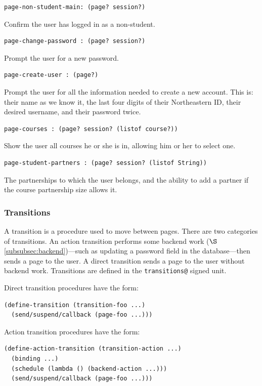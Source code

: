 \documentclass[a4paper]{article}
\begin{document}
\begin{verbatim}
page-non-student-main: (page? session?)
\end{verbatim}
Confirm the user has logged in as a non-student.

\begin{verbatim}
page-change-password : (page? session?)
\end{verbatim}
Prompt the user for a new password.

\begin{verbatim}
page-create-user : (page?)
\end{verbatim}
Prompt the user for all the information needed to create a
new account. This is: their name as we know it, the last
four digits of their Northeastern ID, their desired username,
and their password twice.

\begin{verbatim}
page-courses : (page? session? (listof course?))
\end{verbatim}
Show the user all courses he or she is in, allowing him or her to select one.

\begin{verbatim}
page-student-partners : (page? session? (listof String))
\end{verbatim}
The partnerships to which the user belongs, and the ability to add a partner if
the course partnership size allows it.

\subsubsection{Transitions}\label{subsubsec:transitions}

A transition is a procedure used to move between pages. There are two categories
of transitions. An action transition performs some backend work
($\S$\ref{subsubsec:backend})---such as updating a password field in the
database---then sends a page to the user. A direct transition sends a page to
the user without backend work. Transitions are defined in the
\verb|transitions@| signed unit.

Direct transition procedures have the form:

\begin{verbatim}
(define-transition (transition-foo ...)
  (send/suspend/callback (page-foo ...)))
\end{verbatim}

Action transition procedures have the form:

\begin{verbatim}
(define-action-transition (transition-action ...)
  (binding ...)
  (schedule (lambda () (backend-action ...)))
  (send/suspend/callback (page-foo ...)))
\end{verbatim}
\end{document}
